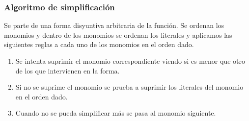 \subsubsection{Algoritmo de simplificación}
Se parte de una forma disyuntiva arbitraria de la función. Se ordenan los monomios y dentro de los monomios se ordenan los literales y aplicamos las siguientes reglas a cada uno de los monomios en el orden dado.
\begin{enumerate}
    \item Se intenta suprimir el monomio correspondiente viendo si es menor que otro de los que intervienen en la forma.
    \item Si no se suprime el monomio se prueba a suprimir los literales del monomio en el orden dado.
    \item Cuando no se pueda simplificar más se pasa al monomio siguiente.
\end{enumerate}
